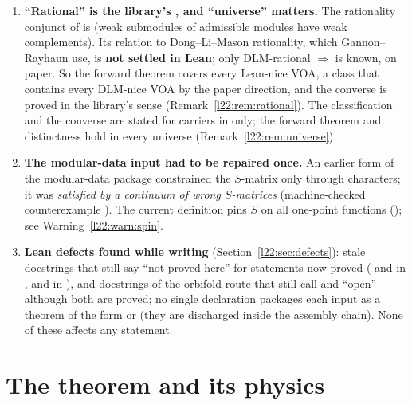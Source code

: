 \begin{enumerate}
  (every categorical step uses it, through the finiteness theorem proved in Step~1 of that argument); since
   is now a theorem, \textbf{the whole classification is unconditional}. The three parts are stated together in universe  (Remark~\ref{l22:rem:universe}).
\item \textbf{``Rational'' is the library's , and ``universe'' matters.} The rationality
  conjunct of  is  (weak submodules of admissible modules have weak complements). Its
  relation to Dong--Li--Mason rationality, which Gannon--Rayhaun use, is \textbf{not settled in Lean}; only DLM-rational
  $\Rightarrow$  is known, on paper. So the forward theorem covers every Lean-nice VOA, a class
  that contains every DLM-nice VOA by the paper direction, and the converse is proved in the library's sense
  (Remark~\ref{l22:rem:rational}). The classification and the converse are stated for carriers in  only; the
  forward theorem and distinctness hold in every universe (Remark~\ref{l22:rem:universe}).
\item \textbf{The modular-data input had to be repaired once.} An earlier form of the modular-data
  package constrained the $S$-matrix only through characters; it was \emph{satisfied by a continuum of
  wrong $S$-matrices} (machine-checked counterexample ). The current
  definition pins $S$ on all one-point functions (); see Warning~\ref{l22:warn:spin}.
\item \textbf{Lean defects found while writing} (Section~\ref{l22:sec:defects}): stale docstrings that
  still say ``not proved here'' for statements now proved ( and
   in ,  and  in
  ), and docstrings of the orbifold route that still call  and
   ``open'' although both are proved; no single
  declaration packages each input as a theorem of the form  or 
  (they are discharged inside the assembly chain). None of these affects any statement.
\end{enumerate}

\section{The theorem and its physics}\label{l22:sec:theorem}


